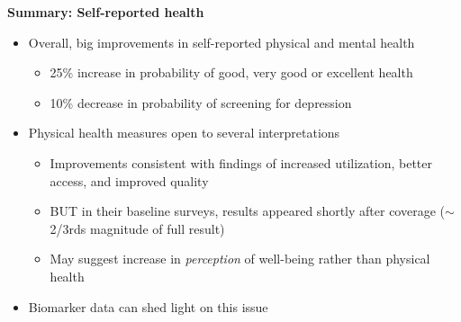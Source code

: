 \documentclass[notes=show]{beamer}
\begin{document}
\begin{frame}[plain]
	\begin{center}
	\textbf{Summary: Self-reported health}
	\end{center}
	
	\begin{itemize}
	\item Overall, big improvements in self-reported physical and mental health
		\begin{itemize}
		\item 25\% increase in probability of good, very good or excellent health
		\item 10\% decrease in probability of screening for depression
		\end{itemize}
	\item Physical health measures open to several interpretations
		\begin{itemize}
		\item Improvements consistent with findings of increased utilization, better access, and improved quality
		\item BUT in their baseline surveys, results appeared shortly after coverage ($\sim$2/3rds magnitude of full result)
		\item May suggest increase in \emph{perception} of well-being rather than physical health
		\end{itemize}
	\item Biomarker data can shed light on this issue
	\end{itemize}
\end{frame}
\end{document}
